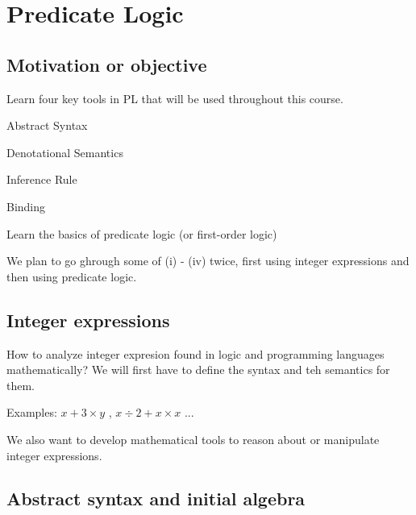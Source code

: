 
\chapter{Predicate Logic}

\section{Motivation or objective}

\begin{enumcirc}
  \item
    Learn four key tools in PL that will be used throughout this course.
    \begin{enumrm}
      \item Abstract Syntax
      \item Denotational Semantics
      \item Inference Rule
      \item Binding
    \end{enumrm}
  \item Learn the basics of predicate logic (or first-order logic)
  \item We plan to go ghrough some of (i) - (iv) twice, first using integer
    expressions and then using predicate logic.
\end{enumcirc}

\section{Integer expressions}

\begin{enumcirc}
  \item
    How to analyze integer expresion found in logic and programming languages
    mathematically? We will first have to define the syntax and teh semantics
    for them.
  \item
    Examples: $x + 3 \times y$ , $x \div 2 + x \times x$ ...
  \item
    We also want to develop mathematical tools to reason about or manipulate
    integer expressions.
\end{enumcirc}

\section{Abstract syntax and initial algebra}

